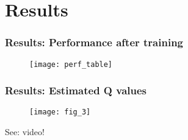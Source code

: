 \section{Results}

\begin{frame}
\frametitle{Results: Performance after training}
\begin{figure}
    \centering
    \texttt{[image: perf\_table]}
\end{figure}
\end{frame}

\begin{frame}
\frametitle{Results: Estimated Q values}

\begin{figure}
    \centering
    \texttt{[image: fig\_3]}
\end{figure}

See: video!
\end{frame}




